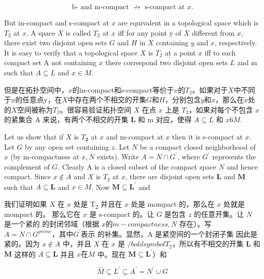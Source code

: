 \documentclass[options]{article}
\begin{document}
		\[
				\text { b- and m-compact } \not\longrightarrow \text { s-compact at } x \text {. }
		\]
\begin{paracol}{2}
	\begin{en}
		But in-compact and s-compact at $x$ are equivalent in a topological space which is $T_2$ at $x$. A space $X$ is called $T_2$ at $x$ iff for any point y of $X$ different from $x$, there exist two disjoint open sets $G$ and $H$ in $X$ containing $y$ and $x$, respectively. It is easy to verify that a topological space $X$ is $T_2$ at a point $x$ iff to each compact set A not containing $x$ there correspond two disjoint open sets $L$ and m such that $A \subseteq L$ and $x \in M$.
	\end{en}
	\begin{cn}
		但是在拓扑空间中，$x$的in-compact和s-compact等价于$x$的$T_2$。如果对于$X$中不同于$x$的任意点y，在$X$中存在两个不相交的开集$G$和$H$，分别包含$y$和$x$，那么在$x$处的$X$空间被称为$T_2$。很容易验证拓扑空间 $X$ 在点 $x$ 上是 $T_2$，如果对每个不包含 $x$ 的紧集合 A 来说，有两个不相交的开集 $\boldsymbol{L}$ 和 m 对应，使得 $A \subseteq L$ 和 $x 6 M$.
	\end{cn}
	\begin{en}
		Let us show that if $X$ is $T_{\mathbf{2}}$ at $x$ and
		m-compact at $x$ then it is s-compact at $x$. Let
		$G$ by any open set containing $z$. Let $N$ be a compact
		closed neighborhood of $x$ (by m-compactness at $x, N$
		exists). Write $A=N \cap G^{\prime}$, where $G^{\prime}$ represents the
		complement of $G$. Clearly A is a closed subset of the compact space
		$N$ and hence compact. Since $x \notin A$ and $X$
		is $T_2$ at $x$, there are disjoint open sets $\boldsymbol{L}$
		and $\boldsymbol{M}$ such that $A \subseteq \boldsymbol{L}$ and $x
		\in M$. Now $\boldsymbol{M} \subseteq \boldsymbol{L}^{\prime}$ and
		
	\end{en}
	\begin{cn}
		我们证明如果 $X$ 在 $x$ 处是 T\textsubscript{\!$2$} 并且在 $x$ 处是 mompact 的，那么在 $x$ 处就是 mompact 的。
		那么它在 $x$ 是 s-compact 的。让
		$G$ 是包含 $z$ 的任意开集。让 $N$ 是一个紧的
		的封闭邻域（根据 $x 的 m-compactness, N$
		存在）。写 $A=N \cap G^{prime}$，其中$G^{\prime}$表示
		的补集。显然，A 是紧空间的一个封闭子集
		因此是紧的。因为 $x \not\in A$ 中，并且 $X$
		在 $x$ 是 $/boldsymbol{T}_2$，所以有不相交的开集 $\boldsymbol{L}$
		和 $\boldsymbol{M}$ 这样的 $A \subseteq \boldsymbol{L}$ 并且 $x
		在 M$ 中。现在 $\boldsymbol{M} \subseteq\boldsymbol{L}^{\prime}$）和
	\end{cn}
\end{paracol}
\[
	\bar{M} \subseteq L^{\prime} \subseteq A^{\prime}=N^{\prime} \cup G
\]
\end{document}

